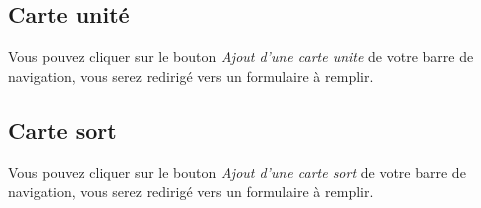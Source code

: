 \documentclass[a4paper,11pt]{report}
\begin{document}
		\subsection{Carte unité}
	Vous pouvez cliquer sur le bouton \textit{Ajout d'une carte unite} de votre barre de navigation, vous serez redirigé vers un formulaire à remplir.
		
		\subsection{Carte sort}
	Vous pouvez cliquer sur le bouton \textit{Ajout d'une carte sort} de votre barre de navigation, vous serez redirigé vers un formulaire à remplir.


        
\end{document}
